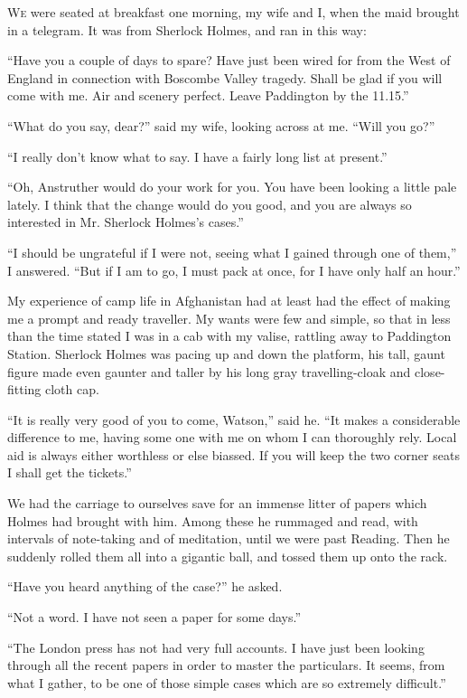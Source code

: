 
\textsc{We} were seated at breakfast one morning, my wife
and I, when the maid brought in a telegram. It
was from Sherlock Holmes, and ran in this way:

“Have you a couple of days to spare? Have
just been wired for from the West of England in connection
with Bos\-combe Valley tragedy. Shall be glad if you will
come with me. Air and scenery perfect. Leave Paddington
by the 11.15.”

“What do you say, dear?” said my wife, looking across at
me. “Will you go?”

“I really don’t know what to say. I have a fairly long list
at present.”

“Oh, Anstruther would do your work for you. You have
been looking a little pale lately. I think that the change
would do you good, and you are always so interested in Mr.
Sherlock Holmes’s cases.”

“I should be ungrateful if I were not, seeing what I gained
through one of them,” I answered. “But if I am to go, I
must pack at once, for I have only half an hour.”

My experience of camp life in Afghanistan had at least had
the effect of making me a prompt and ready traveller. My
wants were few and simple, so that in less than the time
stated I was in a cab with my valise, rattling away to Paddington
Station. Sherlock Holmes was pacing up and down
the platform, his tall, gaunt figure made even gaunter and
taller by his long gray travelling-cloak and close-fitting cloth
cap.

“It is really very good of you to come, Watson,” said he.
“It makes a considerable difference to me, having some one
with me on whom I can thoroughly rely. Local aid is always
either worthless or else biassed. If you will keep the two
corner seats I shall get the tickets.”

We had the carriage to ourselves save for an immense litter
of papers which Holmes had brought with him. Among
these he rummaged and read, with intervals of note-taking
and of meditation, until we were past Reading. Then he
suddenly rolled them all into a gigantic ball, and tossed them
up onto the rack.

“Have you heard anything of the case?” he asked.

“Not a word. I have not seen a paper for some days.”

“The London press has not had very full accounts. I
have just been looking through all the recent papers in order
to master the particulars. It seems, from what I gather,
to be one of those simple cases which are so extremely
difficult.”

